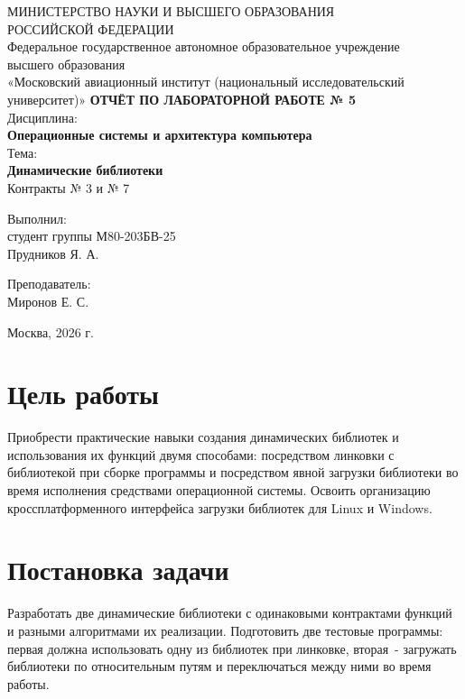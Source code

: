 \documentclass[12pt,a4paper]{article}
\begin{document}
\begin{titlepage}
\begin{center}
{\small МИНИСТЕРСТВО НАУКИ И ВЫСШЕГО ОБРАЗОВАНИЯ\\РОССИЙСКОЙ ФЕДЕРАЦИИ}\\[4mm]
{\small Федеральное государственное автономное образовательное учреждение\\ высшего образования\\ «Московский авиационный институт (национальный исследовательский университет)»}
\vfill
{\bfseries\large ОТЧЁТ ПО ЛАБОРАТОРНОЙ РАБОТЕ № 5}\\[9mm]
Дисциплина:\\[2mm]
{\bfseries Операционные системы и архитектура компьютера}\\[6mm]
Тема:\\[2mm]
{\bfseries Динамические библиотеки}\\[3mm]
Контракты № 3 и № 7
\vfill
\end{center}
\begin{flushright}\begin{minipage}{0.45\textwidth}
Выполнил:\\ студент группы М80-203БВ-25\\ Прудников Я. А.\par\vspace{7mm}
Преподаватель:\\ Миронов Е. С.
\end{minipage}\end{flushright}
\vfill\begin{center}Москва, 2026 г.\end{center}
\end{titlepage}

\section{Цель работы}
Приобрести практические навыки создания динамических библиотек и использования их функций двумя способами: посредством линковки с библиотекой при сборке программы и посредством явной загрузки библиотеки во время исполнения средствами операционной системы. Освоить организацию кроссплатформенного интерфейса загрузки библиотек для Linux и Windows.

\section{Постановка задачи}
Разработать две динамические библиотеки с одинаковыми контрактами функций и разными алгоритмами их реализации. Подготовить две тестовые программы: первая должна использовать одну из библиотек при линковке, вторая~- загружать библиотеки по относительным путям и переключаться между ними во время работы.
\end{document}
